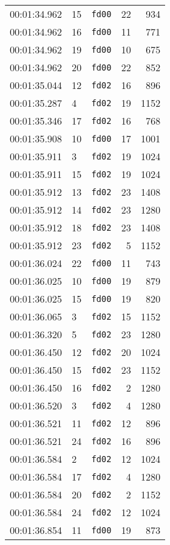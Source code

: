 \documentclass{article}
\begin{document}
\begin{longtable}{lllrr}
00:01:34.962 & 15 & \texttt{fd00} & 22 & 934 \\
00:01:34.962 & 16 & \texttt{fd00} & 11 & 771 \\
00:01:34.962 & 19 & \texttt{fd00} & 10 & 675 \\
00:01:34.962 & 20 & \texttt{fd00} & 22 & 852 \\
00:01:35.044 & 12 & \texttt{fd02} & 16 & 896 \\
00:01:35.287 & 4 & \texttt{fd02} & 19 & 1152 \\
00:01:35.346 & 17 & \texttt{fd02} & 16 & 768 \\
00:01:35.908 & 10 & \texttt{fd00} & 17 & 1001 \\
00:01:35.911 & 3 & \texttt{fd02} & 19 & 1024 \\
00:01:35.911 & 15 & \texttt{fd02} & 19 & 1024 \\
00:01:35.912 & 13 & \texttt{fd02} & 23 & 1408 \\
00:01:35.912 & 14 & \texttt{fd02} & 23 & 1280 \\
00:01:35.912 & 18 & \texttt{fd02} & 23 & 1408 \\
00:01:35.912 & 23 & \texttt{fd02} & 5 & 1152 \\
00:01:36.024 & 22 & \texttt{fd00} & 11 & 743 \\
00:01:36.025 & 10 & \texttt{fd00} & 19 & 879 \\
00:01:36.025 & 15 & \texttt{fd00} & 19 & 820 \\
00:01:36.065 & 3 & \texttt{fd02} & 15 & 1152 \\
00:01:36.320 & 5 & \texttt{fd02} & 23 & 1280 \\
00:01:36.450 & 12 & \texttt{fd02} & 20 & 1024 \\
00:01:36.450 & 15 & \texttt{fd02} & 23 & 1152 \\
00:01:36.450 & 16 & \texttt{fd02} & 2 & 1280 \\
00:01:36.520 & 3 & \texttt{fd02} & 4 & 1280 \\
00:01:36.521 & 11 & \texttt{fd02} & 12 & 896 \\
00:01:36.521 & 24 & \texttt{fd02} & 16 & 896 \\
00:01:36.584 & 2 & \texttt{fd02} & 12 & 1024 \\
00:01:36.584 & 17 & \texttt{fd02} & 4 & 1280 \\
00:01:36.584 & 20 & \texttt{fd02} & 2 & 1152 \\
00:01:36.584 & 24 & \texttt{fd02} & 12 & 1024 \\
00:01:36.854 & 11 & \texttt{fd00} & 19 & 873 \\

\end{longtable}
\end{document}

